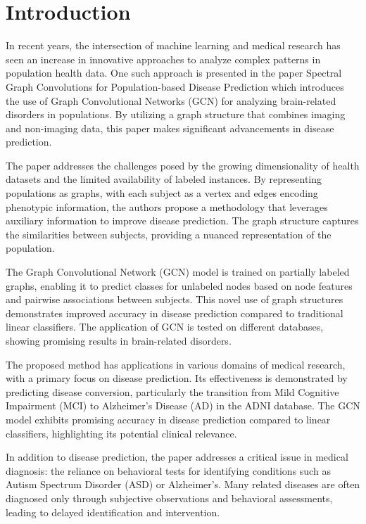 
\section{Introduction}


\quad In recent years, the intersection of machine learning and medical research has seen an increase in innovative approaches to analyze complex patterns in population health data. One such approach is presented in the paper Spectral Graph Convolutions for Population-based Disease Prediction \cite{Parisot17} which introduces the use of Graph Convolutional Networks (GCN) for analyzing brain-related disorders in populations. By utilizing a graph structure that combines imaging and non-imaging data, this paper makes significant advancements in disease prediction.

The paper addresses the challenges posed by the growing dimensionality of health datasets and the limited availability of labeled instances. By representing populations as graphs, with each subject as a vertex and edges encoding phenotypic information, the authors propose a methodology that leverages auxiliary information to improve disease prediction. The graph structure captures the similarities between subjects, providing a nuanced representation of the population.

The Graph Convolutional Network (GCN) model is trained on partially labeled graphs, enabling it to predict classes for unlabeled nodes based on node features and pairwise associations between subjects. This novel use of graph structures demonstrates improved accuracy in disease prediction compared to traditional linear classifiers. The application of GCN is tested on different databases, showing promising results in brain-related disorders.

The proposed method has applications in various domains of medical research, with a primary focus on disease prediction. Its effectiveness is demonstrated by predicting disease conversion, particularly the transition from Mild Cognitive Impairment (MCI) to Alzheimer's Disease (AD) in the ADNI database. The GCN model exhibits promising accuracy in disease prediction compared to linear classifiers, highlighting its potential clinical relevance.

In addition to disease prediction, the paper addresses a critical issue in medical diagnosis: the reliance on behavioral tests for identifying conditions such as Autism Spectrum Disorder (ASD) or Alzheimer's. Many related diseases are often diagnosed only through subjective observations and behavioral assessments, leading to delayed identification and intervention.

